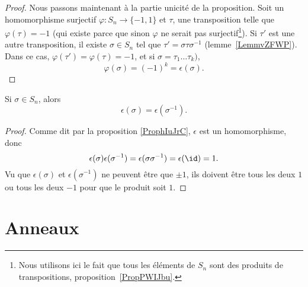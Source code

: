 \begin{proof}
    Nous passons maintenant à la partie unicité de la proposition. Soit un homomorphisme surjectif \( \varphi\colon S_n\to \{ -1,1 \}\) et \( \tau\), une transposition telle que \( \varphi(\tau)=-1\) (qui existe parce que sinon \( \varphi\) ne serait pas surjectif\footnote{Nous utilisons ici le fait que tous les éléments de \( S_n\) sont des produits de transpositions, proposition~\ref{PropPWIJbu}.}). Si \( \tau'\) est une autre transposition, il existe \( \sigma\in S_n\) tel que \( \tau'=\sigma\tau\sigma^{-1}\) (lemme~\ref{LemmvZFWP}). Dans ce cas, \( \varphi(\tau')=\varphi(\tau)=-1\), et si \( \sigma=\tau_1\ldots \tau_k) \),
    \begin{equation}
         \varphi(\sigma)=(-1)^k=\epsilon(\sigma).
    \end{equation}
\end{proof}

\begin{corollary}       \label{CORooZLUKooBOhUPG}
    Si \( \sigma\in S_n\), alors
    \begin{equation}
        \epsilon(\sigma)=\epsilon(\sigma^{-1}).
    \end{equation}
\end{corollary}

\begin{proof}
    Comme dit par la proposition \ref{ProphIuJrC}, \( \epsilon\) est un homomorphisme, donc
    \begin{equation}
        \epsilon(\sigma)\epsilon(\sigma^{-1})=\epsilon(\sigma\sigma^{-1})=\epsilon(\id)=1.
    \end{equation}
    Vu que \( \epsilon(\sigma)\) et \( \epsilon(\sigma^{-1})\) ne peuvent être que \( \pm1\), ils doivent être tous les deux \( 1\) ou tous les deux \( -1\) pour que le produit soit \( 1\).
\end{proof}

\section{Anneaux}

